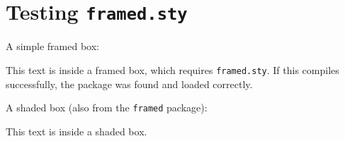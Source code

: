 \documentclass{article}
\begin{document}
\section*{Testing \texttt{framed.sty}}

A simple framed box:

\begin{framed}
  This text is inside a framed box, which requires \texttt{framed.sty}.
  If this compiles successfully, the package was found and loaded correctly.
\end{framed}

A shaded box (also from the \texttt{framed} package):

\begin{shaded}
  This text is inside a shaded box.
\end{shaded}
\end{document}
